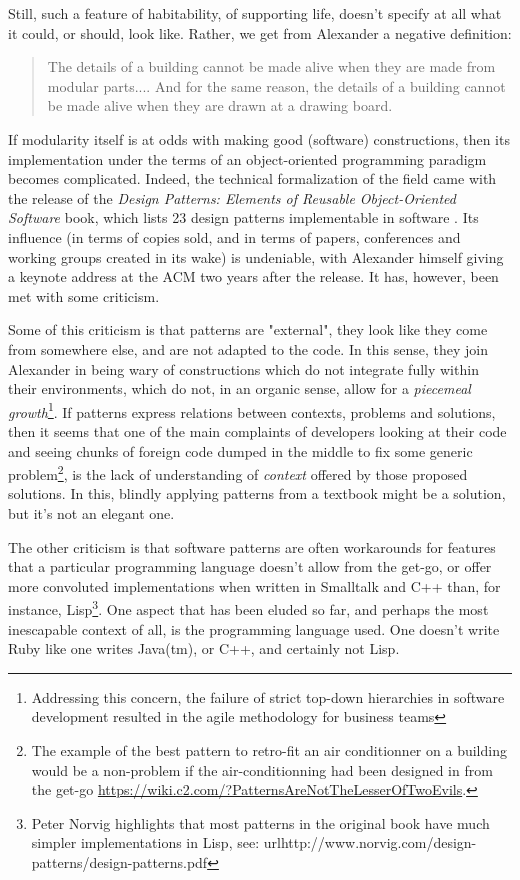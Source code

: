 Still, such a feature of habitability, of supporting life, doesn't specify at all what it could, or should, look like. Rather, we get from Alexander a negative definition:

\begin{quote}
  The details of a building cannot be made alive when they are made from modular parts.... And for the same reason, the details of a building cannot be made alive when they are drawn at a drawing board. \citep{alexander_timeless_1979}
\end{quote}

If modularity itself is at odds with making good (software) constructions, then its implementation under the terms of an object-oriented programming paradigm becomes complicated. Indeed, the technical formalization of the field came with the release of the \emph{Design Patterns: Elements of Reusable Object-Oriented Software} book, which lists 23 design patterns implementable in software \citep{gamma_design_1994}. Its influence (in terms of copies sold, and in terms of papers, conferences and working groups created in its wake) is undeniable, with Alexander himself giving a keynote address at the ACM two years after the release. It has, however, been met with some criticism.

Some of this criticism is that patterns are "external", they look like they come from somewhere else, and are not adapted to the code. In this sense, they join Alexander in being wary of constructions which do not integrate fully within their environments, which do not, in an organic sense, allow for a \emph{piecemeal growth}\footnote{Addressing this concern, the failure of strict top-down hierarchies in software development resulted in the agile methodology for business teams}. If patterns express relations between contexts, problems and solutions, then it seems that one of the main complaints of developers looking at their code and seeing chunks of foreign code dumped in the middle to fix some generic problem\footnote{The example of the best pattern to retro-fit an air conditionner on a building would be a non-problem if the air-conditionning had been designed in from the get-go \url{https://wiki.c2.com/?PatternsAreNotTheLesserOfTwoEvils}.}, is the lack of understanding of \emph{context} offered by those proposed solutions. In this, blindly applying patterns from a textbook might be a solution, but it's not an elegant one.

The other criticism is that software patterns are often workarounds for features that a particular programming language doesn't allow from the get-go, or offer more convoluted implementations when written in Smalltalk and C++ than, for instance, Lisp\footnote{Peter Norvig highlights that most patterns in the original book have much simpler implementations in Lisp, see: url{http://www.norvig.com/design-patterns/design-patterns.pdf}}. One aspect that has been eluded so far, and perhaps the most inescapable context of all, is the programming language used. One doesn't write Ruby like one writes Java(tm), or C++, and certainly not Lisp.

